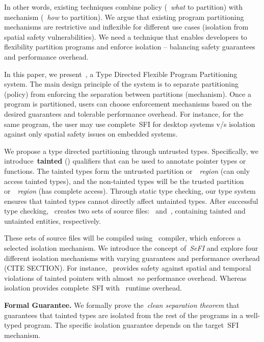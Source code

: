 In other words, existing techniques combine policy (\ie{}~\emph{what} to partition) with mechanism (\ie{}~\emph{how} to partition).
We argue that existing program partitioning mechanisms are restrictive and inflexible for different use cases (\eg isolation from spatial safety vulnerabilities). We need a technique that enables developers to flexibility partition programs and enforce isolation -- balancing safety guarantees and performance overhead.

In this paper, we present~\systemname{}, a Type Directed Flexible Program Partitioning system.
The main design principle of the system is to separate partitioning (\ie policy) from enforcing the separation between partitions (\ie mechanism).
Once a program is partitioned, users can choose enforcement mechanisms based on the desired guarantees and tolerable performance overhead. For instance, for the same program, the user may use complete~\ac{SFI} for desktop systems v/s isolation against only spatial safety issues on embedded systems.

We propose a type directed partitioning through untrusted types.
Specifically, we introduce~\textbf{tainted} (\taintt) qualifiers that can be used to annotate pointer types or functions. 
The tainted types form the untrusted partition or~\umode~\emph{region} (can only access tainted types), and the non-tainted types will be the trusted partition or~\cmode~\emph{region} (has complete access).
Through static type checking, our type system ensures that tainted types cannot directly affect untainted types.
After successful type checking,~\systemname{} creates two sets of source files:~\ucregion{} and~\cregion{}, containing tainted and untainted entities, respectively.

These sets of source files will be compiled using~\systemname{} compiler, which enforces a selected isolation mechanism.
We introduce the concept of~\emph{\acf{SeFI}} and explore four different isolation mechanisms with varying guarantees and performance overhead (CITE SECTION).
For instance,~\isoheap{} provides safety against spatial and temporal violations of tainted pointers with almost~\emph{no} performance overhead.
Whereas~\sandbox{} isolation provides complete~\ac{SFI} with~\avgsandboxoverhead{} runtime overhead.

\noindent\textbf{Formal Guarantee.} We formally prove the~\emph{clean separation theorem} that guarantees that tainted types are isolated from the rest of the programs in a well-typed program.
The specific isolation guarantee depends on the target~\ac{SFI} mechanism.

